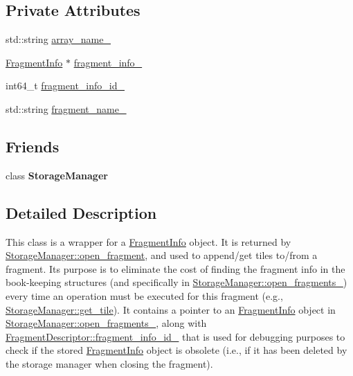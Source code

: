 \subsection*{Private Attributes}
\begin{DoxyCompactItemize}
\item 
std\+::string \hyperlink{classStorageManager_1_1FragmentDescriptor_ada46f739e9df89b421776686b9bd1313}{array\+\_\+name\+\_\+}
\item 
\hyperlink{structStorageManager_1_1FragmentInfo}{Fragment\+Info} $\ast$ \hyperlink{classStorageManager_1_1FragmentDescriptor_a2f5330bdbf0aff8e03650dd103e46b39}{fragment\+\_\+info\+\_\+}
\item 
int64\+\_\+t \hyperlink{classStorageManager_1_1FragmentDescriptor_af22f12dd602adeb5b1fde62593fa1c1b}{fragment\+\_\+info\+\_\+id\+\_\+}
\item 
std\+::string \hyperlink{classStorageManager_1_1FragmentDescriptor_a6e93d68d8fd106ab867a4db03901b322}{fragment\+\_\+name\+\_\+}
\end{DoxyCompactItemize}
\subsection*{Friends}
\begin{DoxyCompactItemize}
\item 
\hypertarget{classStorageManager_1_1FragmentDescriptor_aab928c97ba2ed82b71fb011b1c4fef74}{}class {\bfseries Storage\+Manager}\label{classStorageManager_1_1FragmentDescriptor_aab928c97ba2ed82b71fb011b1c4fef74}

\end{DoxyCompactItemize}


\subsection{Detailed Description}
This class is a wrapper for a \hyperlink{structStorageManager_1_1FragmentInfo}{Fragment\+Info} object. It is returned by \hyperlink{classStorageManager_a8460f9de39a89ffe82f10512e59d4847}{Storage\+Manager\+::open\+\_\+fragment}, and used to append/get tiles to/from a fragment. Its purpose is to eliminate the cost of finding the fragment info in the book-\/keeping structures (and specifically in \hyperlink{classStorageManager_adb5e6670a3394342cc683288430446af}{Storage\+Manager\+::open\+\_\+fragments\+\_\+}) every time an operation must be executed for this fragment (e.\+g., \hyperlink{classStorageManager_a7027871a9acbb91efa82e4a8ca4d9231}{Storage\+Manager\+::get\+\_\+tile}). It contains a pointer to an \hyperlink{structStorageManager_1_1FragmentInfo}{Fragment\+Info} object in \hyperlink{classStorageManager_adb5e6670a3394342cc683288430446af}{Storage\+Manager\+::open\+\_\+fragments\+\_\+}, along with \hyperlink{classStorageManager_1_1FragmentDescriptor_af22f12dd602adeb5b1fde62593fa1c1b}{Fragment\+Descriptor\+::fragment\+\_\+info\+\_\+id\+\_\+} that is used for debugging purposes to check if the stored \hyperlink{structStorageManager_1_1FragmentInfo}{Fragment\+Info} object is obsolete (i.\+e., if it has been deleted by the storage manager when closing the fragment). 

